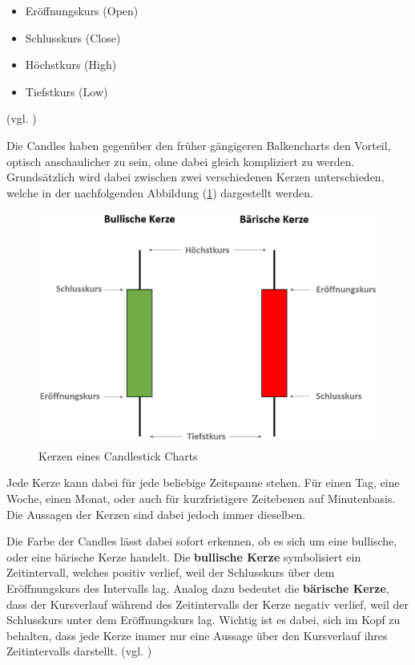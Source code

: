 \documentclass[oneside]{ausarbeitung}
\begin{document}
\begin{itemize}
	\item Eröffnungskurs (Open)
	\item Schlusskurs (Close)
	\item Höchstkurs (High)
	\item Tiefstkurs (Low)
\end{itemize}

(vgl. \cite{candlestick_basics})

Die Candles haben gegenüber den früher gängigeren Balkencharts den
Vorteil, optisch anschaulicher zu sein, ohne dabei gleich kompliziert
zu werden. Grundsätzlich wird dabei zwischen zwei verschiedenen
Kerzen unterschieden, welche in der nachfolgenden Abbildung
(\ref{fig:1}) dargestellt werden. \\

\begin{figure}[H]
  \centering
  \includegraphics[height=0.45\textheight]{img/candles.png}
  \caption{Kerzen eines Candlestick Charts}
  \label{fig:1}
\end{figure}

Jede Kerze kann dabei für jede beliebige Zeitspanne stehen. Für
einen Tag, eine Woche, einen Monat, oder auch für kurzfristigere
Zeitebenen auf Minutenbasis. Die Aussagen der Kerzen sind dabei jedoch
immer dieselben.

Die Farbe der Candles lässt dabei sofort erkennen, ob es sich um eine
bullische, oder eine bärische Kerze handelt. Die \textbf{bullische
Kerze} symbolisiert ein Zeitintervall, welches positiv verlief, weil
der Schlusskurs über dem Eröffnungskurs des Intervalls lag. Analog
dazu bedeutet die \textbf{bärische Kerze}, dass der Kursverlauf
während des Zeitintervalls der Kerze negativ verlief, weil der
Schlusskurs unter dem Eröffnungskurs lag. Wichtig ist es dabei, sich
im Kopf zu behalten, dass jede Kerze immer nur eine Aussage über den
Kursverlauf ihres Zeitintervalls darstellt. (vgl.
\cite{candles_explained})
 
\end{document}
